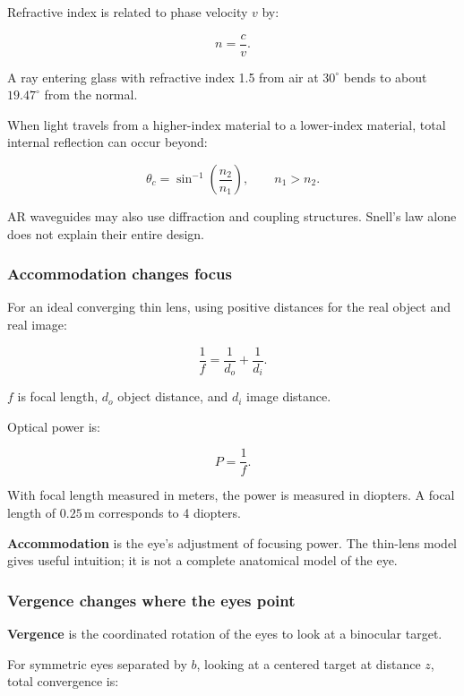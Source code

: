 Refractive index is related to phase velocity \(v\) by:

\[
n=\frac{c}{v}.
\]

A ray entering glass with refractive index 1.5 from air at \(30^\circ\) bends to about \(19.47^\circ\) from the normal.

When light travels from a higher-index material to a lower-index material, total internal reflection can occur beyond:

\[
\theta_c=\sin^{-1}\left(\frac{n_2}{n_1}\right),
\qquad n_1>n_2.
\]

AR waveguides may also use diffraction and coupling structures. Snell's law alone does not explain their entire design.

\subsubsection{Accommodation changes focus}\label{04-visual-computing-ii-ch043-accommodation-changes-focus}

\hypertarget{04-visual-computing-ii-ch043-accommodation-changes-focus}{}

For an ideal converging thin lens, using positive distances for the real object and real image:

\[
\frac1f=\frac1{d_o}+\frac1{d_i}.
\]

\(f\) is focal length, \(d_o\) object distance, and \(d_i\) image distance.

Optical power is:

\[
P=\frac1f.
\]

With focal length measured in meters, the power is measured in diopters. A focal length of \(0.25\,\mathrm{m}\) corresponds to 4 diopters.

\textbf{Accommodation} is the eye's adjustment of focusing power. The thin-lens model gives useful intuition; it is not a complete anatomical model of the eye.

\subsubsection{Vergence changes where the eyes point}\label{04-visual-computing-ii-ch043-vergence-changes-where-the-eyes-point}

\hypertarget{04-visual-computing-ii-ch043-vergence-changes-where-the-eyes-point}{}

\textbf{Vergence} is the coordinated rotation of the eyes to look at a binocular target.

For symmetric eyes separated by \(b\), looking at a centered target at distance \(z\), total convergence is:

